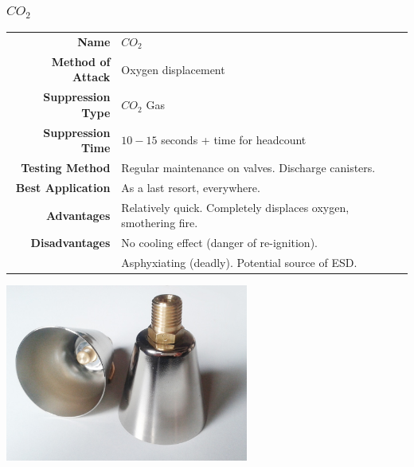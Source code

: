 \documentclass[11pt,a4paper]{article}
\begin{document}
\subsubsection{$CO_2$}
\begin{tabular}{|r|l|}
\hline
\textbf{Name} & $CO_2$\\
\textbf{Method of Attack} & Oxygen displacement\\
\textbf{Suppression Type} & $CO_2$ Gas\\
\textbf{Suppression Time} & $10-15$ seconds + time for headcount\\
\textbf{Testing Method} & Regular maintenance on valves. Discharge canisters. \\
\textbf{Best Application} & As a last resort, everywhere.\\
\textbf{Advantages} & Relatively quick. Completely displaces oxygen, smothering fire.\\
\textbf{Disadvantages} & No cooling effect (danger of re-ignition). \\
& Asphyxiating (deadly). Potential source of ESD.\\
\hline
\end{tabular}
\begin{center}
\includegraphics[width=8cm]{co2}
\end{center}
\end{document}

